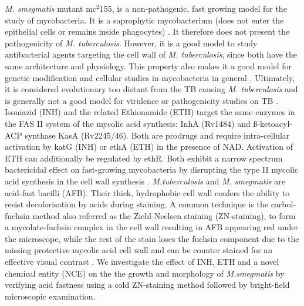 {\textit{M. smegmatis}  mutant mc$^2$155,  is a non-pathogenic, fast growing model for the study of mycobacteria. It is a saprophytic mycobacterium (does not enter the epithelial cells or remains inside phagocytes) \cite{Reyrat2001}. It therefore does not present the pathogenicity of \textit{M. tuberculosis}. However, it is a good model to study antibacterial agents targeting the cell wall of \textit{M. tuberculosis}, since both have the same architecture and physiology. This property also makes it a good model for genetic modification and cellular studies in mycobacteria in general \cite{Sparks2023}. Ultimately, it is considered evolutionary too distant from the TB causing  \textit{M. tuberculosis} and is generally not a good model for virulence or pathogenicity studies on TB \cite{Reyrat2001}. 
Isoniazid (INH) and the related Ethionamide (ETH) target the same enzymes in the FAS II system of the mycolic acid synthesis: InhA (Rv1484) and ß-ketoacyl-ACP synthase KasA (Rv2245/46). Both are prodrugs and require intra-cellular activation by katG (INH) or ethA (ETH) in the presence of NAD. Activation of ETH can additionally be regulated by ethR.
Both exhibit a narrow spectrum bactericidal effect on fast-growing mycobacteria by disrupting the type II mycolic acid synthesis in the cell wall synthesis \cite{Banerjee1994,York2008}.
\textit{M.tuberculosis} and \textit{M. smegmatis} are acid-fast bacilli (AFB). Their thick, hydrophobic cell wall confers the ability to resist decolorisation by acids during staining. A common technique is the carbol-fuchsin method also referred as the Ziehl-Neelsen staining (ZN-staining), to form a mycolate-fuchsin complex in the cell wall resulting in AFB appearing red under the microscope, while the rest of the stain loses the fuchsin component due to the missing protective mycolic acid cell wall and can be counter stained for an effective visual contrast \cite{Bayot2022}. We investigate the effect of INH, ETH and a novel chemical entity (NCE) on the the growth and morphology of \textit{M.smegmatis} by verifying acid fastness using a cold ZN-staining method followed by bright-field microscopic examination.

}
\endinput